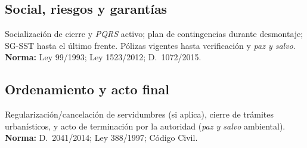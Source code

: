\subsection{Social, riesgos y garantías}
Socialización de cierre y \emph{PQRS} activo; plan de contingencias durante desmontaje; SG-SST hasta el último frente. Pólizas vigentes hasta verificación y \textit{paz y salvo}.\\
\textbf{Norma:} Ley 99/1993; Ley 1523/2012; D.~1072/2015.

\subsection{Ordenamiento y acto final}
Regularización/cancelación de servidumbres (si aplica), cierre de trámites urbanísticos, y acto de terminación por la autoridad (\emph{paz y salvo} ambiental).\\
\textbf{Norma:} D.~2041/2014; Ley 388/1997; Código Civil.
